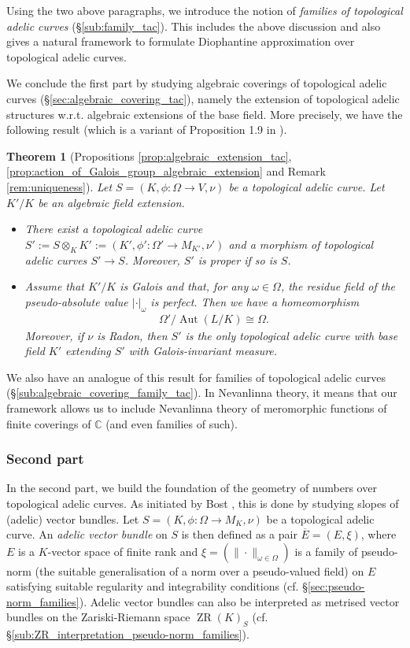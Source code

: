 \documentclass [11pt,reqno]{amsart}
\def\bC{{\mathbb{C}}}
\newcommand{\1}{\mathmybb{1}}
\def\Aut{\operatorname{Aut}}
\def\ZR{\operatorname{ZR}}
\newtheorem{theo}{Theorem}
\begin{document}
Using the two above paragraphs, we introduce the notion of \emph{families of topological adelic curves} (\S \ref{sub:family_tac}). This includes the above discussion and also gives a natural framework to formulate Diophantine approximation over topological adelic curves.  

We conclude the first part by studying algebraic coverings of topological adelic curves (\S \ref{sec:algebraic_covering_tac}), namely the extension of topological adelic structures w.r.t. algebraic extensions of the base field. More precisely, we have the following result (which is a variant of Proposition 1.9 in \cite{GVF24}).  

\begin{theo}[Propositions \ref{prop:algebraic_extension_tac}, \ref{prop:action_of_Galois_group_algebraic_extension} and Remark \ref{rem:uniqueness}]
Let $S=(K,\phi : \Omega \to V, \nu)$ be a topological adelic curve. Let $K'/K$ be an algebraic field extension. 
\begin{itemize}
	\item[(1)] There exist a topological adelic curve $S' := S \otimes_K K' := (K',\phi':\Omega' \to M_{K'},\nu')$ and a morphism of topological adelic curves $S' \to S$. Moreover, $S'$ is proper if so is $S$. 
	\item[(2)] Assume that  $K'/K$ is Galois and that, for any $\omega\in\Omega$, the residue field of the pseudo-absolute value $|\cdot|_{\omega}$ is perfect. Then we have a homeomorphism
	\begin{align*}
	\Omega'/\Aut(L/K) \cong \Omega.
	\end{align*}
	Moreover, if $\nu$ is Radon, then $S'$ is the only topological adelic curve with base field $K'$ extending $S'$ with Galois-invariant measure.  
\end{itemize}
\end{theo}
We also have an analogue of this result for families of topological adelic curves (\S \ref{sub:algebraic_covering_family_tac}). In Nevanlinna theory, it means that our framework allows us to include Nevanlinna theory of meromorphic functions of finite coverings of $\bC$ (and even families of such).

\subsubsection*{Second part}

In the second part, we build the foundation of the geometry of numbers over topological adelic curves. As initiated by Bost \cite{Bost96,Bost01}, this is done by studying slopes of (adelic) vector bundles. Let $S=(K,\phi : \Omega \to M_{K}, \nu)$ be a topological adelic curve. An \emph{adelic vector bundle} on $S$ is then defined as a pair $\overline{E}=(E,\xi)$, where $E$ is a $K$-vector space of finite rank and $\xi=(\|\cdot\|_{\omega\in \Omega})$ is a family of pseudo-norm (the suitable generalisation of a norm over a pseudo-valued field) on $E$ satisfying suitable regularity and integrability conditions (cf. \S \ref{sec:pseudo-norm_families}). Adelic vector bundles can also be interpreted as metrised vector bundles on the Zariski-Riemann space $\ZR(K)_{S}$ (cf. \S \ref{sub:ZR_interpretation_pseudo-norm_families}).
\end{document}
